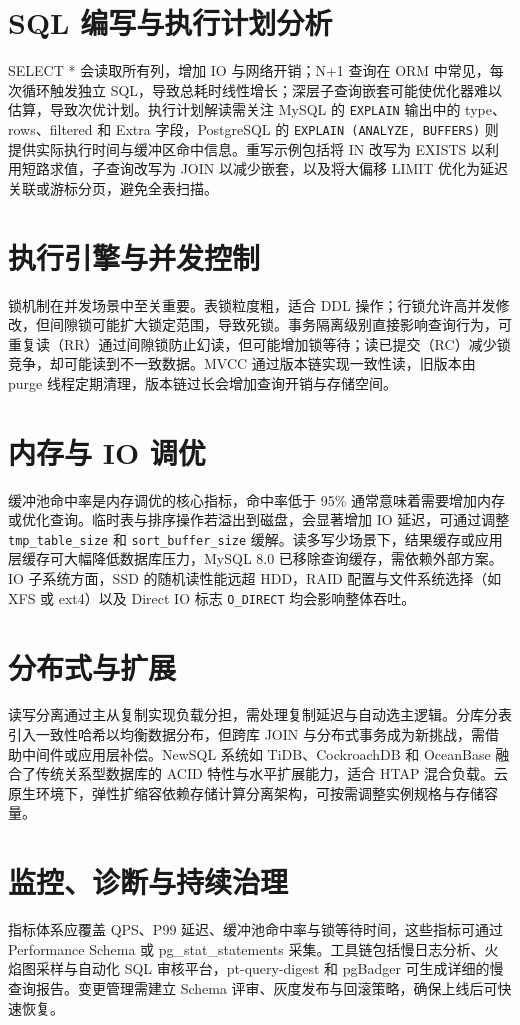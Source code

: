 \chapter{SQL 编写与执行计划分析}
SELECT * 会读取所有列，增加 IO 与网络开销；N+1 查询在 ORM 中常见，每次循环触发独立 SQL，导致总耗时线性增长；深层子查询嵌套可能使优化器难以估算，导致次优计划。执行计划解读需关注 MySQL 的 \texttt{EXPLAIN} 输出中的 type、rows、filtered 和 Extra 字段，PostgreSQL 的 \texttt{EXPLAIN (ANALYZE, BUFFERS)} 则提供实际执行时间与缓冲区命中信息。重写示例包括将 IN 改写为 EXISTS 以利用短路求值，子查询改写为 JOIN 以减少嵌套，以及将大偏移 LIMIT 优化为延迟关联或游标分页，避免全表扫描。\par
\chapter{执行引擎与并发控制}
锁机制在并发场景中至关重要。表锁粒度粗，适合 DDL 操作；行锁允许高并发修改，但间隙锁可能扩大锁定范围，导致死锁。事务隔离级别直接影响查询行为，可重复读（RR）通过间隙锁防止幻读，但可能增加锁等待；读已提交（RC）减少锁竞争，却可能读到不一致数据。MVCC 通过版本链实现一致性读，旧版本由 purge 线程定期清理，版本链过长会增加查询开销与存储空间。\par
\chapter{内存与 IO 调优}
缓冲池命中率是内存调优的核心指标，命中率低于 95\%{} 通常意味着需要增加内存或优化查询。临时表与排序操作若溢出到磁盘，会显著增加 IO 延迟，可通过调整 \texttt{tmp\_{}table\_{}size} 和 \texttt{sort\_{}buffer\_{}size} 缓解。读多写少场景下，结果缓存或应用层缓存可大幅降低数据库压力，MySQL 8.0 已移除查询缓存，需依赖外部方案。IO 子系统方面，SSD 的随机读性能远超 HDD，RAID 配置与文件系统选择（如 XFS 或 ext4）以及 Direct IO 标志 \texttt{O\_{}DIRECT} 均会影响整体吞吐。\par
\chapter{分布式与扩展}
读写分离通过主从复制实现负载分担，需处理复制延迟与自动选主逻辑。分库分表引入一致性哈希以均衡数据分布，但跨库 JOIN 与分布式事务成为新挑战，需借助中间件或应用层补偿。NewSQL 系统如 TiDB、CockroachDB 和 OceanBase 融合了传统关系型数据库的 ACID 特性与水平扩展能力，适合 HTAP 混合负载。云原生环境下，弹性扩缩容依赖存储计算分离架构，可按需调整实例规格与存储容量。\par
\chapter{监控、诊断与持续治理}
指标体系应覆盖 QPS、P99 延迟、缓冲池命中率与锁等待时间，这些指标可通过 Performance Schema 或 pg\_{}stat\_{}statements 采集。工具链包括慢日志分析、火焰图采样与自动化 SQL 审核平台，pt-query-digest 和 pgBadger 可生成详细的慢查询报告。变更管理需建立 Schema 评审、灰度发布与回滚策略，确保上线后可快速恢复。\par

